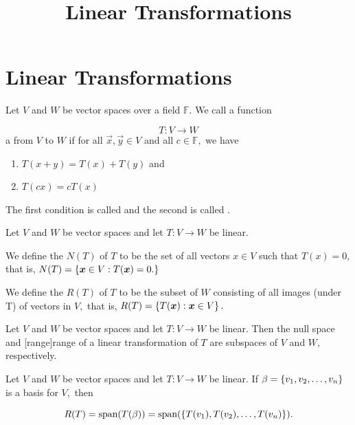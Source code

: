 \documentclass{article}
\title{Linear Transformations}
\begin{document}
\section{Linear Transformations}

\begin{definition}
	Let $V$ and $W$ be \@{vector spaces} over a \@{field} $\mathbb{F}.$ We call a \@{function}

	\[ T: V \to W \] a  from $V$ to $W$ if for all $\vec{x}, \vec{y} \in V$ and all $c \in \mathbb{F},$ we have

	\begin{enumerate}[label=(\alph*)]
		\item $T(x + y) = T(x) + T(y)$ and
		\item $T(cx) = cT(x)$
	\end{enumerate}

	The first condition is called  and the second is called .
\end{definition}

\begin{definition}
	Let $V$ and $W$ be \@{vector spaces} and let $T: V \to W$ be \@{linear}.

	We define the  $N(T)$ of $T$ to be the \@{set} of all \@{vectors} $x \in V$ such that $T(x) = 0,$ that is, $N(T) = \left\{ \boldsymbol{x} \in V : T(\boldsymbol{x}) = 0. \right\}$

	We define the  $R(T)$ of $T$ to be the \@{subset} of $W$ consisting of all \@{images} (under T) of vectors in $V,$ that is, $R(T) = \left\{ T(\boldsymbol{x}) : \boldsymbol{x} \in V \right\}.$
\end{definition}

\begin{theorem}
	Let $V$ and $W$ be \@{vector spaces} and let $T: V \to W$ be \@{linear}. Then the \@{null space} and \@[range]{range of a linear transformation} of $T$ are \@{subspaces} of $V$ and $W,$ respectively.
\end{theorem}

\begin{theorem}
	Let $V$ and $W$ be \@{vector spaces} and let $T: V \to W$ be \@{linear}. If $\beta = \left\{ v_1, v_2, \dots, v_n \right\}$ is a \@{basis} for $V,$ then

	\[ R(T) = \text{span}{(T(\beta))} = \text{span}{(\left\{ T(v_1), T(v_2), \dots, T(v_n) \right\} )}. \]
\end{theorem}
\end{document}
